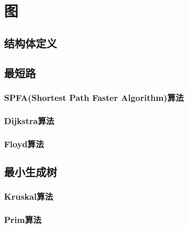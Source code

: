 
\section{图}
\subsection{结构体定义}

\subsection{最短路}
\subsubsection{SPFA(Shortest Path Faster Algorithm)算法}
\subsubsection{Dijkstra算法}
\subsubsection{Floyd算法}

\subsection{最小生成树}
\subsubsection{Kruskal算法}
\subsubsection{Prim算法}

